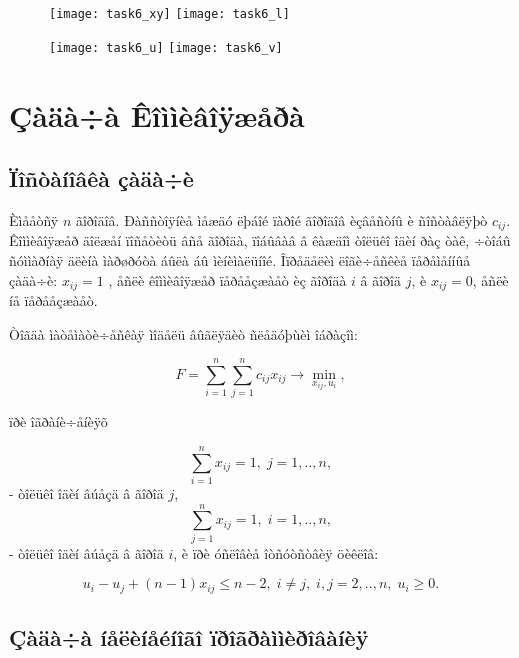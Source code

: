 \documentclass[14pt]{article}
\begin{document}
\begin{figure}
\begin{floatrow}
    {\texttt{[image: task6\_xy]}}
    {\texttt{[image: task6\_l]}}
\end{floatrow}
\end{figure}

\begin{figure}
\begin{floatrow}
    {\texttt{[image: task6\_u]}}
    {\texttt{[image: task6\_v]}}
\end{floatrow}
\end{figure}

\newpage
\section{Çàäà÷à Êîììèâîÿæåðà}
\subsection{Ïîñòàíîâêà çàäà÷è}

Èìååòñÿ $n$ ãîðîäîâ. Ðàññòîÿíèå ìåæäó ëþáîé ïàðîé ãîðîäîâ èçâåñòíû è ñîñòàâëÿþò $c_{ij}$. Êîììèâîÿæåð äîëæåí ïîñåòèòü âñå ãîðîäà, ïîáûâàâ â êàæäîì òîëüêî îäèí ðàç òàê, ÷òîáû ñóììàðíàÿ äëèíà ìàðøðóòà áûëà áû ìèíèìàëüíîé. Îïðåäåëèì ëîãè÷åñêèå ïåðåìåííûå çàäà÷è: $x_{ij} = 1$ , åñëè êîììèâîÿæåð ïåðååçæàåò èç ãîðîäà $i$ â ãîðîä $j$, è $x_{ij} = 0$, åñëè íå ïåðååçæàåò.

Òîãäà ìàòåìàòè÷åñêàÿ ìîäåëü âûãëÿäèò ñëåäóþùèì îáðàçîì:

\begin{equation}\label{syst8}
    F = \sum_{i=1}^n \sum_{j=1}^n c_{ij}x_{ij} \rightarrow \min_{x_{ij},u_i},
\end{equation}

ïðè îãðàíè÷åíèÿõ

$$
    \sum_{i=1}^n x_{ij} = 1, \; j = 1,..,n,
$$
- òîëüêî îäèí âúåçä â ãîðîä $j$,
$$
    \sum_{j=1}^n x_{ij} = 1, \; i = 1,..,n,
$$
- òîëüêî îäèí âúåçä â ãîðîä $i$, è ïðè óñëîâèå îòñóòñòâèÿ öèêëîâ:

$$
    u_i-u_j+(n-1)x_{ij} \le  n - 2, \; i \neq j, \; i,j = 2,..,n, \; u_i \ge 0.
$$


\subsection{Çàäà÷à íåëèíåéíîãî ïðîãðàììèðîâàíèÿ}
\end{document}
